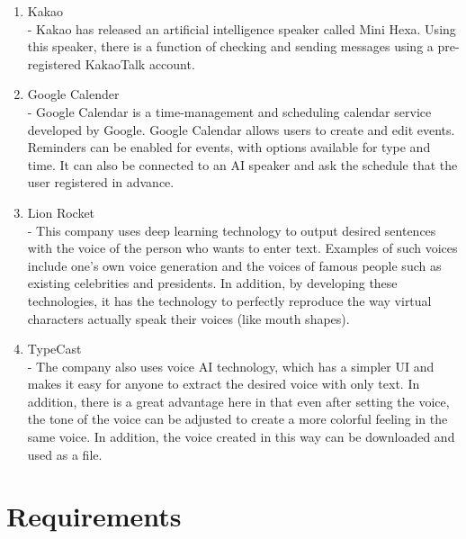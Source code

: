 \documentclass[conference]{IEEEtran}
\begin{document}
\begin{enumerate}
    \item Kakao\\
    - Kakao has released an artificial intelligence speaker called Mini Hexa. Using this speaker, there is a function of checking and sending messages using a pre-registered KakaoTalk account.
    \item Google Calender\\
    - Google Calendar is a time-management and scheduling calendar service developed by Google. Google Calendar allows users to create and edit events. Reminders can be enabled for events, with options available for type and time. It can also be connected to an AI speaker and ask the schedule that the user registered in advance.
    \item Lion Rocket\\
    - This company uses deep learning technology to output desired sentences with the voice of the person who wants to enter text. Examples of such voices include one's own voice generation and the voices of famous people such as existing celebrities and presidents. In addition, by developing these technologies, it has the technology to perfectly reproduce the way virtual characters actually speak their voices (like mouth shapes).
    \item TypeCast\\
    - The company also uses voice AI technology, which has a simpler UI and makes it easy for anyone to extract the desired voice with only text. In addition, there is a great advantage here in that even after setting the voice, the tone of the voice can be adjusted to create a more colorful feeling in the same voice. In addition, the voice created in this way can be downloaded and used as a file.
\end{enumerate}

\section{Requirements}
\end{document}
